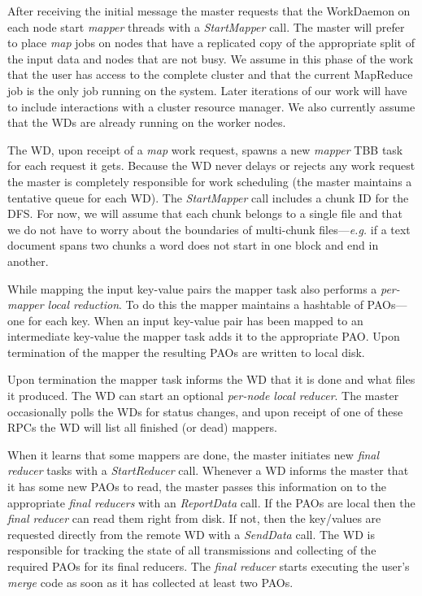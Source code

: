 \documentclass[10pt,letter,final,article,twocolumn]{article} %
\newcommand{\rpc}[1]{\emph{#1}}
\begin{document}
After receiving the initial message the master requests that the WorkDaemon on each node start \emph{mapper} threads with a \rpc{StartMapper} call. The master will prefer to place \emph{map} jobs on nodes that have a replicated copy of the appropriate split of the input data and nodes that are not busy.  We assume in this phase of the work that the user has access to the complete cluster and that the current MapReduce job is the only job running on the system. Later iterations of our work will have to include interactions with a cluster resource manager. We also currently assume that the WDs are already running on the worker nodes.

The WD, upon receipt of a \emph{map} work request, spawns a new \emph{mapper} TBB task for each request it gets. Because the WD never delays or rejects any work request the master is completely responsible for work scheduling (the master maintains a tentative queue for each WD). The \rpc{StartMapper} call includes a chunk ID for the DFS. For now, we will assume that each chunk belongs to a single file and that we do not have to worry about the boundaries of multi-chunk files---\textit{e.g.} if a text document spans two chunks a word does not start in one block and end in another.

While mapping the input key-value pairs the mapper task also performs a  \emph{per-mapper local reduction}. To do this the mapper maintains a hashtable of PAOs---one for each key. When an input key-value pair has been mapped to an intermediate key-value the mapper task adds it to the appropriate PAO. Upon termination of the mapper the resulting PAOs are written to local disk. 

Upon termination the mapper task informs the WD that it is done and what files it produced. The WD can start an optional \emph{per-node local reducer}. The master occasionally polls the WDs for status changes, and upon receipt of one of these RPCs the WD will list all finished (or dead) mappers. 

When it learns that some mappers are done, the master initiates new \emph{final reducer} tasks with a \rpc{StartReducer} call. Whenever a WD informs the master that it has some new PAOs to read, the master passes this information on to the appropriate \emph{final reducers} with an \rpc{ReportData} call. If the PAOs  are local then the \emph{final reducer} can read them right from disk. If not, then the key/values are requested directly from the remote WD with a \rpc{SendData} call. The WD is responsible for tracking the state of all transmissions and collecting of the required PAOs for its final reducers. The \emph{final reducer} starts executing the user's \emph{merge} code as soon as it has collected at least two PAOs.
\end{document}
